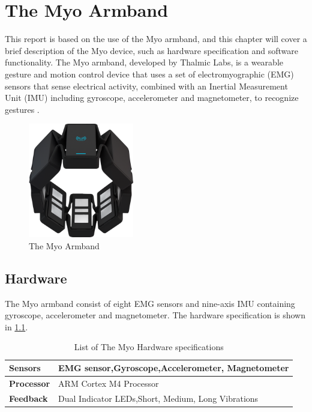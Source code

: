 \chapter{The Myo Armband}
\label{chap:myo}
This report is based on the use of the Myo armband, and this chapter will cover a brief description of the Myo device, such as hardware specification and software functionality. The Myo armband, developed by Thalmic Labs, is a wearable gesture and motion control device that uses a set of electromyographic (EMG) sensors that sense electrical activity, combined with an Inertial Measurement Unit (IMU) including gyroscope, accelerometer and magnetometer, to recognize gestures \cite{myo}.

\begin{figure}[ht]
    \centering
    \includegraphics[height=5cm]{content/03-Myo_Armband/images/myo.png}
    \caption[The Myo Armband]{The Myo Armband}
    \label{fig:myoarmband}
\end{figure}


\section{Hardware}
The Myo armband consist of eight EMG sensors and nine-axis IMU containing gyroscope, accelerometer and magnetometer. The hardware specification is shown in \cref{table:myo_hardware}.

\begin{table}[ht!]
\centering
    \begin{tabular}{ | l | p{8cm} |}
        \hline
        \textbf{Sensors} & EMG sensor,\newline Gyroscope,\newline Accelerometer, \newline Magnetometer\\ \hline
        
        \textbf{Processor} & ARM Cortex M4 Processor  \\ \hline
        
        \textbf{Feedback} & Dual Indicator LEDs,\newline Short, Medium, Long Vibrations  \\ \hline
    \end{tabular}
    \caption[The Myo Hardware]{List of The Myo Hardware specifications}
    \label{table:myo_hardware}
\end{table}

